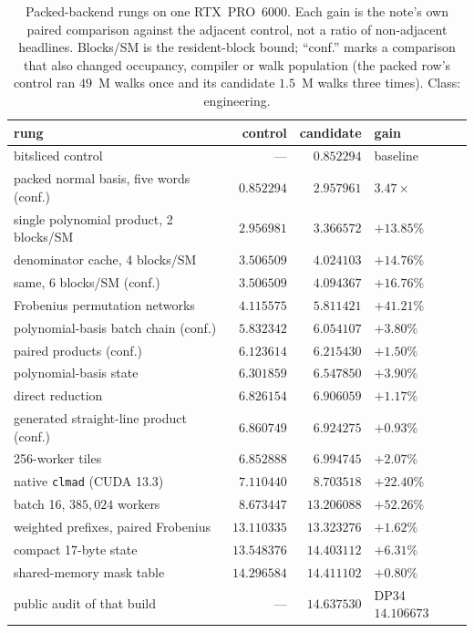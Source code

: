 \begin{table}[t]
\centering
\small
\caption{Packed-backend rungs on one RTX~PRO~6000. Each gain is the
  note's own paired comparison against the adjacent control, not a
  ratio of non-adjacent headlines. Blocks/SM is the resident-block bound; ``conf.'' marks a comparison
  that also changed occupancy, compiler or walk population (the packed
  row's control ran $49$~M walks once and its candidate $1.5$~M walks
  three times). Class: engineering.}
\label{tab:ledger}
\begin{tabular}{@{}p{}rrl@{}}
\toprule
rung & control & candidate & gain \\
\midrule
bitsliced control & --- & $0.852294$ & baseline \\
packed normal basis, five words (conf.) & $0.852294$ & $2.957961$ & $3.47\times$ \\
single polynomial product, 2 blocks/SM & $2.956981$ & $3.366572$ & $+13.85\%$ \\
denominator cache, 4 blocks/SM & $3.506509$ & $4.024103$ & $+14.76\%$ \\
\quad same, 6 blocks/SM (conf.) & $3.506509$ & $4.094367$ & $+16.76\%$ \\
Frobenius permutation networks & $4.115575$ & $5.811421$ & $+41.21\%$ \\
polynomial-basis batch chain (conf.) & $5.832342$ & $6.054107$ & $+3.80\%$ \\
paired products (conf.) & $6.123614$ & $6.215430$ & $+1.50\%$ \\
polynomial-basis state & $6.301859$ & $6.547850$ & $+3.90\%$ \\
direct reduction & $6.826154$ & $6.906059$ & $+1.17\%$ \\
generated straight-line product (conf.) & $6.860749$ & $6.924275$ & $+0.93\%$ \\
256-worker tiles & $6.852888$ & $6.994745$ & $+2.07\%$ \\
native \texttt{clmad} (CUDA 13.3) & $7.110440$ & $8.703518$ & $+22.40\%$ \\
batch 16, $385{,}024$ workers & $8.673447$ & $13.206088$ & $+52.26\%$ \\
weighted prefixes, paired Frobenius & $13.110335$ & $13.323276$ & $+1.62\%$ \\
compact 17-byte state & $13.548376$ & $14.403112$ & $+6.31\%$ \\
shared-memory mask table & $14.296584$ & $14.411102$ & $+0.80\%$ \\
\quad public audit of that build & --- & $14.637530$ & DP34 $14.106673$ \\
\bottomrule
\end{tabular}
\end{table}

